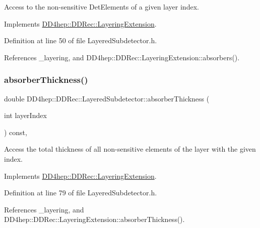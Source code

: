 Access to the non-\/sensitive Det\+Elements of a given layer index. 



Implements \hyperlink{class_d_d4hep_1_1_d_d_rec_1_1_layering_extension_a1204ac80c52fbca9ce3f71e2b3662eab}{D\+D4hep\+::\+D\+D\+Rec\+::\+Layering\+Extension}.



Definition at line 50 of file Layered\+Subdetector.\+h.



References \+\_\+layering, and D\+D4hep\+::\+D\+D\+Rec\+::\+Layering\+Extension\+::absorbers().

\hypertarget{class_d_d4hep_1_1_d_d_rec_1_1_layered_subdetector_a192ffcc5da25ec4041b504da260eeae5}{}\label{class_d_d4hep_1_1_d_d_rec_1_1_layered_subdetector_a192ffcc5da25ec4041b504da260eeae5} 
\subsubsection{\texorpdfstring{absorber\+Thickness()}{absorberThickness()}}
{\footnotesize\ttfamily double D\+D4hep\+::\+D\+D\+Rec\+::\+Layered\+Subdetector\+::absorber\+Thickness (\begin{DoxyParamCaption}\item[{int}]{layer\+Index }\end{DoxyParamCaption}) const\hspace{0.3cm}{\ttfamily [inline]}, {\ttfamily [virtual]}}



Access the total thickness of all non-\/sensitive elements of the layer with the given index. 



Implements \hyperlink{class_d_d4hep_1_1_d_d_rec_1_1_layering_extension_ab4c19a0eccfd5cffc6816fa3b0ec9fb7}{D\+D4hep\+::\+D\+D\+Rec\+::\+Layering\+Extension}.



Definition at line 79 of file Layered\+Subdetector.\+h.



References \+\_\+layering, and D\+D4hep\+::\+D\+D\+Rec\+::\+Layering\+Extension\+::absorber\+Thickness().

\hypertarget{class_d_d4hep_1_1_d_d_rec_1_1_layered_subdetector_a6abda5bb466aecbc60735dabe056a0eb}{}\label{class_d_d4hep_1_1_d_d_rec_1_1_layered_subdetector_a6abda5bb466aecbc60735dabe056a0eb} 

